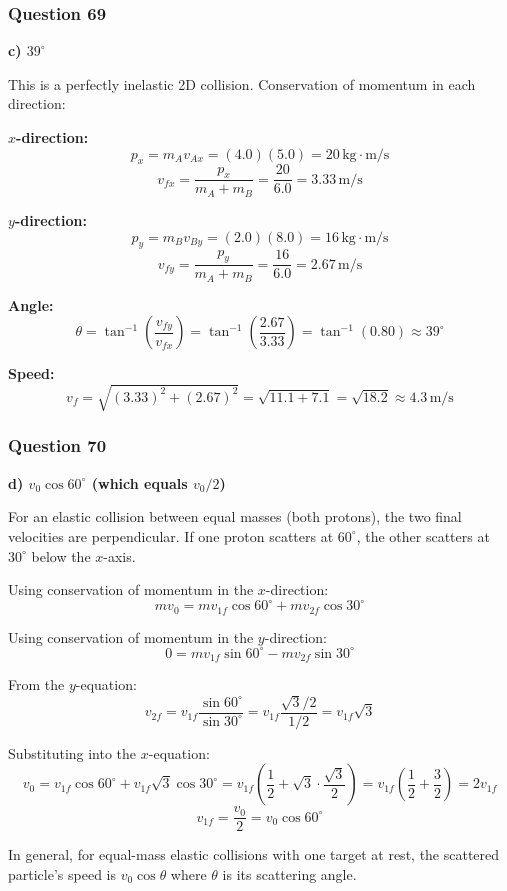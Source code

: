 \documentclass[12pt,letterpaper]{article}
\begin{document}
\subsubsection*{Question 69}

\begin{answerbox}
\textbf{c) $39^\circ$}
\end{answerbox}

\begin{explanationbox}
This is a perfectly inelastic 2D collision. Conservation of momentum in each direction:

\textbf{$x$-direction:}
\[
p_x = m_A v_{Ax} = (4.0)(5.0) = 20\,\text{kg}\cdot\text{m/s}
\]
\[
v_{fx} = \frac{p_x}{m_A + m_B} = \frac{20}{6.0} = 3.33\,\text{m/s}
\]

\textbf{$y$-direction:}
\[
p_y = m_B v_{By} = (2.0)(8.0) = 16\,\text{kg}\cdot\text{m/s}
\]
\[
v_{fy} = \frac{p_y}{m_A + m_B} = \frac{16}{6.0} = 2.67\,\text{m/s}
\]

\textbf{Angle:}
\[
\theta = \tan^{-1}\!\left(\frac{v_{fy}}{v_{fx}}\right) = \tan^{-1}\!\left(\frac{2.67}{3.33}\right) = \tan^{-1}(0.80) \approx 39^\circ
\]

\textbf{Speed:}
\[
v_f = \sqrt{(3.33)^2 + (2.67)^2} = \sqrt{11.1 + 7.1} = \sqrt{18.2} \approx 4.3\,\text{m/s}
\]
\end{explanationbox}

\subsubsection*{Question 70}

\begin{answerbox}
\textbf{d) $v_0\cos 60^\circ$ (which equals $v_0/2$)}
\end{answerbox}

\begin{explanationbox}
For an elastic collision between equal masses (both protons), the two final velocities are perpendicular. If one proton scatters at $60^\circ$, the other scatters at $30^\circ$ below the $x$-axis.

Using conservation of momentum in the $x$-direction:
\[
mv_0 = mv_{1f}\cos 60^\circ + mv_{2f}\cos 30^\circ
\]

Using conservation of momentum in the $y$-direction:
\[
0 = mv_{1f}\sin 60^\circ - mv_{2f}\sin 30^\circ
\]

From the $y$-equation:
\[
v_{2f} = v_{1f}\frac{\sin 60^\circ}{\sin 30^\circ} = v_{1f}\frac{\sqrt{3}/2}{1/2} = v_{1f}\sqrt{3}
\]

Substituting into the $x$-equation:
\[
v_0 = v_{1f}\cos 60^\circ + v_{1f}\sqrt{3}\cos 30^\circ = v_{1f}\left(\frac{1}{2} + \sqrt{3}\cdot\frac{\sqrt{3}}{2}\right) = v_{1f}\left(\frac{1}{2} + \frac{3}{2}\right) = 2v_{1f}
\]
\[
v_{1f} = \frac{v_0}{2} = v_0\cos 60^\circ
\]

In general, for equal-mass elastic collisions with one target at rest, the scattered particle's speed is $v_0\cos\theta$ where $\theta$ is its scattering angle.
\end{explanationbox}
\end{document}
